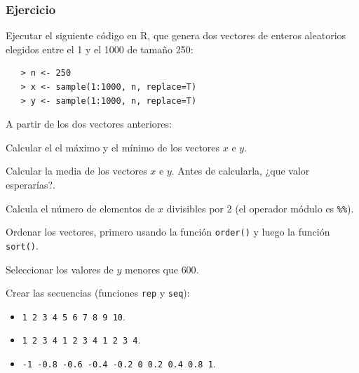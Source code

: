 \documentclass{beamer}
\newenvironment{wideenumerate}{\enumerate\addtolength{\itemsep}{8pt}}{\endenumerate}
\begin{document}
\begin{frame}
\frametitle{Ejercicio}

Ejecutar el siguiente código en R, que genera dos vectores de enteros aleatorios elegidos entre el 1 y el 1000 de tamaño 250:
\begin{verbatim}
   > n <- 250
   > x <- sample(1:1000, n, replace=T)
   > y <- sample(1:1000, n, replace=T)
\end{verbatim}

A partir de los dos vectores anteriores:

\begin{wideenumerate}
\item Calcular el el máximo y el mínimo de los vectores $x$ e $y$.
\item Calcular la media de los vectores $x$ e $y$. Antes de calcularla, ¿que valor esperarías?.
\item Calcula el número de elementos de $x$ divisibles por 2 (el operador módulo es \texttt{\%\%}).
\framebreak
\item Ordenar los vectores, primero usando la función \texttt{order()} y luego la función \texttt{sort()}.
\item Seleccionar los valores de $y$ menores que $600$.
\item Crear las secuencias (funciones \texttt{rep} y \texttt{seq}):
\begin{itemize}
\item \texttt{1 2 3 4 5 6 7 8 9 10}.
\item \texttt{1 2 3 4 1 2 3 4 1 2 3 4}.
\item \texttt{-1 -0.8 -0.6 -0.4 -0.2 0 0.2 0.4 0.8 1}.
\end{itemize}
\end{wideenumerate}
\end{frame}
\end{document}
